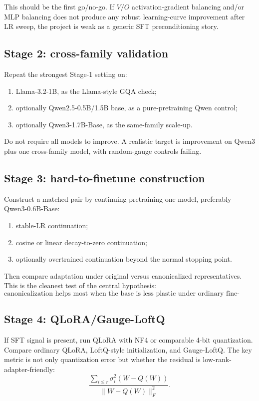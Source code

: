 \documentclass[11pt]{article}
\begin{document}
This should be the first go/no-go. If $V/O$ activation-gradient balancing and/or MLP balancing does not produce any robust learning-curve improvement after LR sweep, the project is weak as a generic SFT preconditioning story.

\subsection{Stage 2: cross-family validation}

Repeat the strongest Stage-1 setting on:
\begin{enumerate}[leftmargin=*]
    \item Llama-3.2-1B, as the Llama-style GQA check;
    \item optionally Qwen2.5-0.5B/1.5B base, as a pure-pretraining Qwen control;
    \item optionally Qwen3-1.7B-Base, as the same-family scale-up.
\end{enumerate}

Do not require all models to improve. A realistic target is improvement on Qwen3 plus one cross-family model, with random-gauge controls failing.

\subsection{Stage 3: hard-to-finetune construction}

Construct a matched pair by continuing pretraining one model, preferably Qwen3-0.6B-Base:
\begin{enumerate}[leftmargin=*]
    \item stable-LR continuation;
    \item cosine or linear decay-to-zero continuation;
    \item optionally overtrained continuation beyond the normal stopping point.
\end{enumerate}

Then compare adaptation under original versus canonicalized representatives. This is the cleanest test of the central hypothesis:
\[
    \text{canonicalization helps most when the base is less plastic under ordinary fine-tuning.}
\]

\subsection{Stage 4: QLoRA/Gauge-LoftQ}

If SFT signal is present, run QLoRA with NF4 or comparable 4-bit quantization. Compare ordinary QLoRA, LoftQ-style initialization, and Gauge-LoftQ. The key metric is not only quantization error but whether the residual is low-rank-adapter-friendly:
\[
    \frac{\sum_{i\le r}\sigma_i^2(W-Q(W))}{\|W-Q(W)\|_F^2}.
\]
\end{document}
